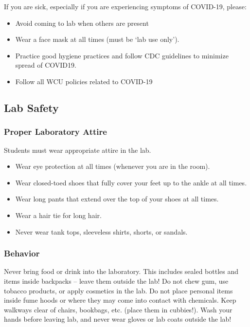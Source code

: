 \documentclass[11pt]{article}
\begin{document}
If you are sick, especially if you are experiencing symptoms of COVID-19, please:

\begin{itemize}
\item Avoid coming to lab when others are present
\item Wear a face mask at all times (must be ‘lab use only’).
\item Practice good hygiene practices and follow CDC guidelines to minimize spread of COVID19.
\item Follow all WCU policies related to COVID-19
\end{itemize}

\subsection{Lab Safety}
\label{sec:org00e120d}

\subsubsection{Proper Laboratory Attire}
\label{sec:orgbba403d}

Students must wear appropriate attire in the lab.

\begin{itemize}
\item Wear eye protection at all times (whenever you are in the room).
\item Wear closed-toed shoes that fully cover your feet up to the ankle at all times.
\item Wear long pants that extend over the top of your shoes at all times.
\item Wear a hair tie for long hair.
\item Never wear tank tops, sleeveless shirts, shorts, or sandals.
\end{itemize}

\subsubsection{Behavior}
\label{sec:org661989d}

Never bring food or drink into the laboratory. This includes sealed bottles and items inside backpacks – leave them outside the lab! Do not chew gum, use tobacco products, or apply cosmetics in the lab. Do not place personal items inside fume hoods or where they may come into contact with chemicals. Keep walkways clear of chairs, bookbags, etc. (place them in cubbies!). Wash your hands before leaving lab, and never wear gloves or lab coats outside the lab!
\end{document}
